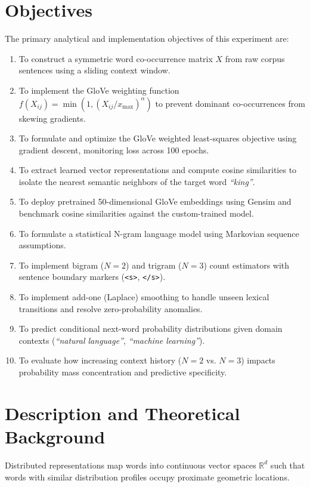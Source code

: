 \documentclass[12pt,a4paper]{report}
\begin{document}
\section{Objectives}
The primary analytical and implementation objectives of this experiment are:
\begin{enumerate}[label=\textbf{\arabic*.}]
    \item To construct a symmetric word co-occurrence matrix $X$ from raw corpus sentences using a sliding context window.
    \item To implement the GloVe weighting function $f(X_{ij}) = \min(1, (X_{ij}/x_{\max})^\alpha)$ to prevent dominant co-occurrences from skewing gradients.
    \item To formulate and optimize the GloVe weighted least-squares objective using gradient descent, monitoring loss across 100 epochs.
    \item To extract learned vector representations and compute cosine similarities to isolate the nearest semantic neighbors of the target word \textit{``king''}.
    \item To deploy pretrained 50-dimensional GloVe embeddings using Gensim and benchmark cosine similarities against the custom-trained model.
    \item To formulate a statistical N-gram language model using Markovian sequence assumptions.
    \item To implement bigram ($N=2$) and trigram ($N=3$) count estimators with sentence boundary markers (\texttt{<s>}, \texttt{</s>}).
    \item To implement add-one (Laplace) smoothing to handle unseen lexical transitions and resolve zero-probability anomalies.
    \item To predict conditional next-word probability distributions given domain contexts (\textit{``natural language''}, \textit{``machine learning''}).
    \item To evaluate how increasing context history ($N=2$ vs. $N=3$) impacts probability mass concentration and predictive specificity.
\end{enumerate}

\section{Description and Theoretical Background}
Distributed representations map words into continuous vector spaces $\mathbb{R}^d$ such that words with similar distribution profiles occupy proximate geometric locations.
\end{document}
